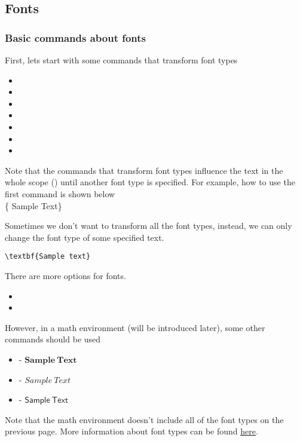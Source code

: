 \subsection{Fonts}

\begin{frame}
    \frametitle{Basic commands about fonts}
    First, lets start with some commands that transform font types
    \begin{itemize}
        \item {}
        \item {}
        \item {}
        \item {}
        \item {}
        \item {}
        \item {}
    \end{itemize}
    Note that the commands that transform font types influence the text in the whole scope () until another font type is specified. For example, how to use the first command  is shown below\\[0.5em]
    \{ Sample Text\}
\end{frame}

\begin{frame}[fragile]
    Sometimes we don't want to transform  all the font types, instead, we can only change the font type of some specified text.
    \begin{example}
        \begin{verbatim}
\textbf{Sample text}
		\end{verbatim}
    \end{example}
    There are more options for fonts.
    \begin{itemize}
        \item {}
        \item {}
    \end{itemize}
    However, in a math environment (will be introduced later), some other commands should be used
    \begin{itemize}
        \item {} - $\mathbf{Sample\ Text}$
        \item {} - $\mathit{Sample\ Text}$
        \item {} - $\mathsf{Sample\ Text}$
    \end{itemize}
    Note that the math environment doesn't include all of the font types on the previous page. More information about font types can be found \href{http://www.cnblogs.com/make217/p/6123532.html}{\color{blue}\underline{here}}.
\end{frame}

